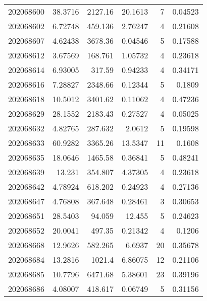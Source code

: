 \begin{tabular}{rrrrrr}
 202068600 &         38.3716  &     2127.16   &           20.1613  &           7 & 0.04523 \\
 202068602 &          6.72748 &      459.136  &            2.76247 &           4 & 0.21608 \\
 202068607 &          4.62438 &     3678.36   &            0.04546 &           5 & 0.17588 \\
 202068612 &          3.67569 &      168.761  &            1.05732 &           4 & 0.23618 \\
 202068614 &          6.93005 &      317.59   &            0.94233 &           4 & 0.34171 \\
 202068616 &          7.28827 &     2348.66   &            0.12344 &           5 & 0.1809  \\
 202068618 &         10.5012  &     3401.62   &            0.11062 &           4 & 0.47236 \\
 202068629 &         28.1552  &     2183.43   &            0.27527 &           4 & 0.05025 \\
 202068632 &          4.82765 &      287.632  &            2.0612  &           5 & 0.19598 \\
 202068633 &         60.9282  &     3365.26   &           13.5347  &          11 & 0.1608  \\
 202068635 &         18.0646  &     1465.58   &            0.36841 &           5 & 0.48241 \\
 202068639 &         13.231   &      354.807  &            4.37305 &           4 & 0.23618 \\
 202068642 &          4.78924 &      618.202  &            0.24923 &           4 & 0.27136 \\
 202068647 &          4.76808 &      367.648  &            0.28461 &           3 & 0.30653 \\
 202068651 &         28.5403  &       94.059  &           12.455   &           5 & 0.24623 \\
 202068652 &         20.0041  &      497.35   &            0.21342 &           4 & 0.1206  \\
 202068668 &         12.9626  &      582.265  &            6.6937  &          20 & 0.35678 \\
 202068684 &         13.2816  &     1021.4    &            6.86075 &          12 & 0.21106 \\
 202068685 &         10.7796  &     6471.68   &            5.38601 &          23 & 0.39196 \\
 202068686 &          4.08007 &      418.617  &            0.06749 &           5 & 0.31156 \\

\end{tabular}
